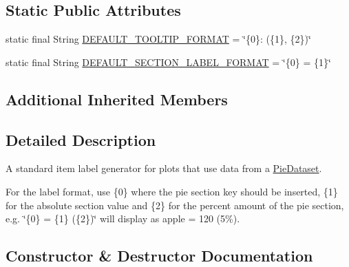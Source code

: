 \subsection*{Static Public Attributes}
\begin{DoxyCompactItemize}
\item 
static final String \mbox{\hyperlink{classorg_1_1jfree_1_1chart_1_1labels_1_1_standard_pie_tool_tip_generator_a815aa512e809e115970498d4a1d6ea76}{D\+E\+F\+A\+U\+L\+T\+\_\+\+T\+O\+O\+L\+T\+I\+P\+\_\+\+F\+O\+R\+M\+AT}} = \char`\"{}\{0\}\+: (\{1\}, \{2\})\char`\"{}
\item 
static final String \mbox{\hyperlink{classorg_1_1jfree_1_1chart_1_1labels_1_1_standard_pie_tool_tip_generator_a5dc585e904200ee2586253a2bb6bb390}{D\+E\+F\+A\+U\+L\+T\+\_\+\+S\+E\+C\+T\+I\+O\+N\+\_\+\+L\+A\+B\+E\+L\+\_\+\+F\+O\+R\+M\+AT}} = \char`\"{}\{0\} = \{1\}\char`\"{}
\end{DoxyCompactItemize}
\subsection*{Additional Inherited Members}


\subsection{Detailed Description}
A standard item label generator for plots that use data from a \mbox{\hyperlink{}{Pie\+Dataset}}. 

For the label format, use \{0\} where the pie section key should be inserted, \{1\} for the absolute section value and \{2\} for the percent amount of the pie section, e.\+g. {\ttfamily \char`\"{}\{0\} = \{1\} (\{2\})\char`\"{}} will display as {\ttfamily apple = 120 (5\%)}. 

\subsection{Constructor \& Destructor Documentation}
\mbox{\label{classorg_1_1jfree_1_1chart_1_1labels_1_1_standard_pie_tool_tip_generator_a07ee8a666b99e941d8478bdffa77a10d}} 

